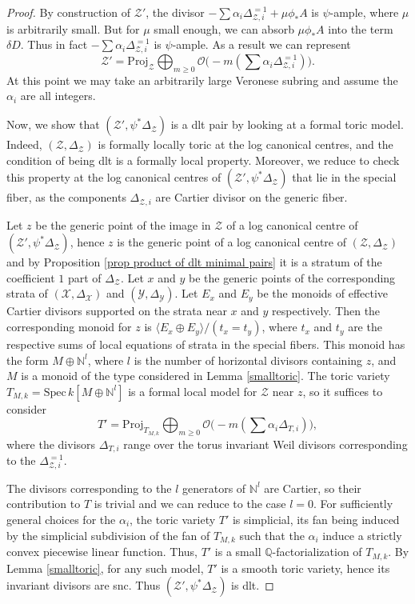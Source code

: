 \documentclass{amsart}%
\numberwithin{equation}{subsection}
\theoremstyle{plain2}
\theoremstyle{definition2}
\theoremstyle{stepstyle}
\theoremstyle{point}
\theoremstyle{subpoint}
\newcommand{\Q}{\ensuremath{\mathbb{Q}}}
\newcommand{\cX}{\ensuremath{\mathscr{X}}}
\newcommand{\cY}{\ensuremath{\mathscr{Y}}}
\newcommand{\cZ}{\ensuremath{\mathscr{Z}}}
\renewcommand{\cY}{\ensuremath{\mathscr{Y}}}
\newcommand{\Spec}{\ensuremath{\mathrm{Spec}\,}}
\begin{document}
\begin{proof}
By construction of $\cZ'$, the divisor $-\sum \alpha_i \Delta_{\cZ,i}^{=1} + \mu \phi_* A$ is $\psi$-ample, where $\mu$ is arbitrarily small. But for $\mu$ small enough, we can absorb $\mu \phi_* A$ into the term $\delta D$. Thus in fact $-\sum \alpha_i \Delta_{\cZ,i}^{=1}$ is $\psi$-ample. As a result we can represent $$\cZ' = \text{Proj}_\cZ \bigoplus_{m \geqslant 0} \mathcal{O}\big(-m(\sum \alpha_i \Delta_{\cZ,i}^{=1})\big).$$ At this point we may take an arbitrarily large Veronese subring and assume the $\alpha_i$ are all integers.

Now, we show that $(\cZ', \psi^*\Delta_\cZ)$ is a dlt pair %
by looking at a formal toric model. Indeed, $(\cZ,\Delta_{\cZ})$ is formally locally toric at the log canonical centres, and the condition of being dlt is a formally local property. Moreover, we reduce to check this property at the log canonical centres of  $(\cZ', \psi^*\Delta_\cZ)$ that lie in the special fiber, as the components $\Delta_{\cZ,i}$ are Cartier divisor on the generic fiber.

Let $z$ be the generic point of the image in $\cZ$ of a log canonical centre of $(\cZ', \psi^*\Delta_\cZ)$, hence $z$ is the generic point of a log canonical centre of $(\cZ,\Delta_{\cZ})$ and by Proposition \ref{prop product of dlt minimal pairs} it is a stratum of the coefficient $1$ part of $\Delta_{\cZ}$. Let $x$ and $y$ be the generic points of the corresponding strata of $(\cX,\Delta_\cX)$ and $(\cY, \Delta_\cY)$. Let $E_x$ and $E_y$ be the monoids of effective Cartier divisors supported on the strata near $x$ and $y$ respectively. Then the corresponding monoid for $z$ is $\langle E_x \oplus E_y \rangle /(t_x=t_y)$, where $t_x$ and $t_y$ are the respective sums of local equations of strata in the special fibers. This monoid has the form $M \oplus \mathbb{N}^l$, where $l$ is the number of horizontal divisors containing $z$, and $M$ is a monoid of the type considered in Lemma \ref{smalltoric}. The toric variety $T_{M,k}=\Spec k[M \oplus \mathbb{N}^l]$ is a formal local model for $\cZ$ near $z$, so it suffices to consider $$T'=\text{Proj}_{T_{M,k}} \bigoplus_{m \geqslant 0} \mathcal{O}\big(-m(\sum \alpha_i \Delta_{T,i})\big),$$ where the divisors $\Delta_{T,i}$ range over the torus invariant Weil divisors corresponding to the $\Delta_{\cZ,i}^{=1}$.

The divisors corresponding to the $l$ generators of $\mathbb{N}^l$ are Cartier, so their contribution to $T$ is trivial and we can reduce to the case $l=0$. For sufficiently general choices for the $\alpha_i$, the toric variety $T'$ is simplicial, its fan being induced by the simplicial subdivision of the fan of $T_{M,k}$ such that the $\alpha_i$ induce a strictly convex piecewise linear function. Thus, $T'$ is a small $\Q$-factorialization of $T_{M,k}$. By Lemma \ref{smalltoric}, for any such model, $T'$ is a smooth toric variety, hence its invariant divisors are snc. Thus $(\cZ', \psi^*\Delta_\cZ)$ is dlt.


\end{proof}
\end{document}
